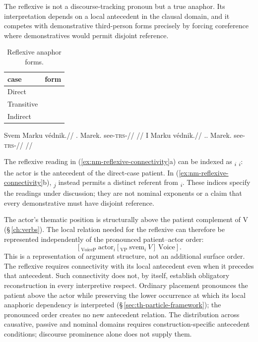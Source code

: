 The reflexive is not a discourse-tracking pronoun but a true anaphor. Its
interpretation depends on a local antecedent in the clausal domain, and it
competes with demonstrative third-person forms precisely by forcing coreference
where demonstratives would permit disjoint reference.

\begin{table}[ht]
  \footnotesize
  \caption{Reflexive anaphor forms.}
  \label{tab:nm-reflexive}
  \begin{tabularx}{0.5\textwidth}{L l}
    \toprule
    {\sc case} & {\sc form} \\
    \midrule
    Direct     &  \\
    Transitive &   \\
    Indirect   &   \\
    \bottomrule
  \end{tabularx}
\end{table}

\pex\label{ex:nm-reflexive-connectivity}
\a
\begingl
\gla Svem Marku védnik.//
\glb \Refl{}.\Dir{} Marek.\Trs{} see-\textsc{trs}-\Pf{}//
\glft {}//
\endgl
\a
\begingl
\gla I Marku védnik.//
.\Dist{}.\Dir{} Marek.\Trs{} see-\textsc{trs}-\Pf{}//
\glft {}//
\endgl
\xe

\noindent The reflexive reading in (\ref{ex:nm-reflexive-connectivity}a)
can be indexed as \textsubscript{$i$}
\textsubscript{$i$}: the actor is the antecedent of the
direct-case patient. In (\ref{ex:nm-reflexive-connectivity}b),
\textsubscript{$j$} instead permits a distinct referent from
\textsubscript{$i$}. These indices specify the readings under
discussion; they are not nominal exponents or a claim that every demonstrative
must have disjoint reference.

The actor's thematic position is structurally above the patient complement
of V (§\,\ref{ch:verbs}). The local relation needed for the reflexive can
therefore be represented independently of the pronounced patient--actor order:
\[
 [_{\mathrm{VoiceP}}\ \mathrm{actor}_{i}
   [_{\mathrm{VP}}\ \mathrm{svem}_{i}\ V]\ \mathrm{Voice}].
\]
This is a representation of argument structure, not an additional surface
order. The reflexive requires connectivity with its local antecedent even
when it precedes that antecedent. Such connectivity does not, by itself,
establish obligatory reconstruction in every interpretive respect. Ordinary
placement pronounces the patient above the actor while preserving the lower
occurrence at which its local anaphoric dependency is interpreted
(§\,\ref{sec:th-particle-framework}); the pronounced order creates no new
antecedent relation. The distribution
across causative, passive and nominal domains requires construction-specific
antecedent conditions; discourse prominence alone does not supply them.

